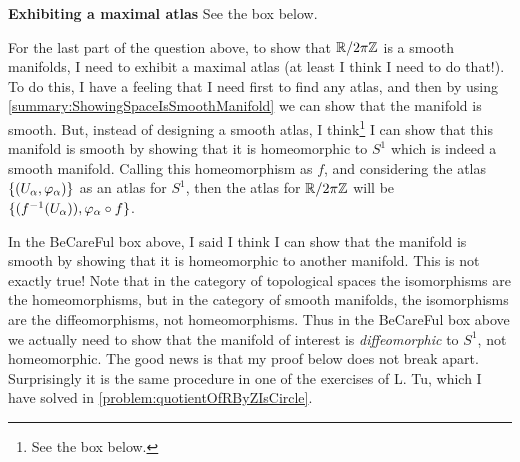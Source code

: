 \begin{solution}
	\noindent \textbf{Exhibiting a maximal atlas} See the box below.
	
	\begin{carefull}
		For the last part of the question above, to show that $ \mathbb{R}/2\pi\mathbb{Z} $ is a smooth manifolds, I need to exhibit a maximal atlas (at least I think I need to do that!). To do this, I have a feeling that I need first to find any atlas, and then by using \autoref{summary:ShowingSpaceIsSmoothManifold} we can show that the manifold is smooth. But, instead of designing a smooth atlas, I {\color{red} think}\footnote{See the box below.} I can show that this manifold is smooth by showing that it is homeomorphic to $ S^1 $ which is indeed a smooth manifold. Calling this homeomorphism as $ f $, and considering the atlas $ \{(U_\alpha, \varphi_\alpha)\} $ as an atlas for $ S^1 $, then the atlas for $ \mathbb{R}/2\pi\mathbb{Z} $ will be $ \{(f^{-1}(U_\alpha)), \varphi_\alpha\circ f\} $.
	\end{carefull}
	
	\begin{carefull}
		In the BeCareFul box above, I said I think I can show that the manifold is smooth by showing that it is homeomorphic to another manifold. This is not exactly true! Note that in the category of topological spaces the isomorphisms are the homeomorphisms, but in the category of smooth manifolds, the isomorphisms are the diffeomorphisms, not homeomorphisms. Thus in the BeCareFul box above we actually need to show that the manifold of interest is \emph{diffeomorphic} to $ S^1 $, not homeomorphic. The good news is that my proof below does not break apart. Surprisingly it is the same procedure in one of the exercises of L. Tu, which I have solved in \autoref{problem:quotientOfRByZIsCircle}.
	\end{carefull}
	

\end{solution}
